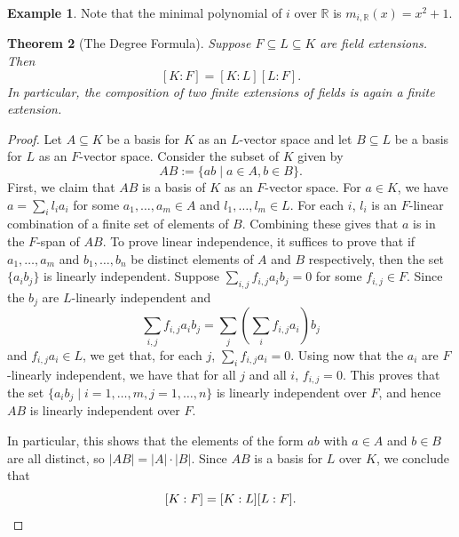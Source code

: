 \documentclass[12pt]{report}
\newtheorem{theorem}{Theorem}[chapter]
\numberwithin{equation}{section}
\numberwithin{theorem}{chapter}
\theoremstyle{definition}
\newtheorem{example}[theorem]{Example}
\newtheorem*{basic properties}{Basic Properties}
\newtheorem*{Important Remark}{Important Remark}
\begin{document}
\begin{example}
Note that the minimal polynomial of $i$ over $\mathbb{R}$ is $m_{i,\mathbb{R}}(x) = x^2 + 1$.
\end{example}



\begin{theorem}[The Degree Formula]\label{deg formula}
Suppose $F \subseteq L \subseteq K$ are field extensions. Then
$$[K:F] = [K:L] [L:F].$$
In particular, the composition of two finite extensions of fields is again a finite extension.
\end{theorem}



\begin{proof}
Let $A \subseteq K$ be a basis for $K$ as an $L$-vector space and let $B \subseteq L$ be a basis for $L$ as an $F$-vector space. Consider the subset of $K$ given by 
$$AB := \{ab \mid a \in A, b \in B\}.$$ 
First, we claim that $AB$ is a basis of $K$ as an $F$-vector space. For $a \in K$, we have $a = \sum_i l_i a_i$ for some $a_1, \dots, a_m \in A$ and $l_1, \dots, l_m \in L$. For each $i$, $l_i$ is an $F$-linear combination of a finite set of elements of $B$. Combining these gives that $a$ is in the $F$-span of $AB$. To prove linear independence, it suffices to prove that if $a_1, \dots, a_m$ and $b_1, \dots, b_n$ be distinct elements of $A$ and $B$ respectively, then the set $\{a_ib_j\}$ is linearly independent.
Suppose $\sum_{i,j} f_{i,j} a_i b_j = 0$ for some $f_{i,j} \in F$. Since the $b_j$ are $L$-linearly independent and
$$\sum_{i,j} f_{i,j} a_i b_j = \sum_j \left(\sum_i f_{i,j} a_i \right) b_j$$
and $f_{i,j} a_i \in L$, we get that, for each $j$, $\sum_i f_{i,j} a_i = 0$. Using now that the $a_i$ are $F$-linearly independent, we have that for all $j$ and all $i$, $f_{i,j} = 0$. This proves that the set $\{a_i b_j \mid i = 1, \ldots, m, j = 1, \ldots, n\}$ is linearly independent over $F$, and hence $AB$ is linearly independent over $F$.


In particular, this shows that the elements of the form $ab$ with $a \in A$ and $b \in B$ are all distinct, so $|AB| = |A| \cdot |B|$. Since $AB$ is a basis for $L$ over $K$, we conclude that
$$[K:F] = [K:L] [L:F].\qedhere$$
\end{proof}
\end{document}
